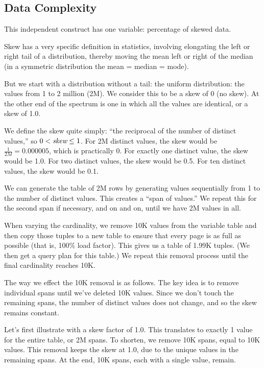 \documentclass[prodmode,acmtods]{acmsmall}
\begin{document}
\subsection{Data Complexity}\label{sec:datacomplexity}
This independent construct has one variable: percentage of skewed data.

Skew has a very specific definition in statistics, 
involving elongating the left or right tail of a distribution, 
thereby moving the mean left or right of the median 
(in a symmetric distribution the mean = median = mode).

But we start with a distribution without a tail: 
the uniform distribution: the values from 1 to 2 million (2M). 
We consider this to be a skew of 0 (no skew). 
At the other end of the spectrum is one in which all the values are identical, 
or a skew of 1.0.

We define the skew quite simply: ``the reciprocal of the number of distinct
values,'' so $0 < \hbox{\em skew} \leq 1$.
For 2M distinct values, the skew would be $\frac{1}{2M}= 0.000005$, which is practically 0. 
For exactly one distinct value, the skew would be 1.0. For two distinct values, 
the skew would be 0.5. For ten distinct values, the skew would be 0.1.

We can generate the table of 2M rows by generating values sequentially from
1 to the number of distinct values.  This creates a ``span of values.'' We
repeat this for the second span if necessary, and on and on, until we have
2M values in all.

When varying the cardinality, we remove 10K values from the variable table
and then copy those tuples to a new table to ensure that every page is as
full as possible (that is, 100\% load factor).  This gives us a table of
1.99K tuples. (We then get a query plan for this table.)  We repeat this
removal process until the final cardinality reaches 10K.

The way we effect the 10K removal is as follows. 
The key idea is to remove individual spans until we've deleted 10K
values. Since we don't touch the remaining spans, the number of distinct
values does not change, and so the skew remains constant.

Let's first illustrate with a skew factor of 1.0. 
This translates to exactly 1 value for the entire table, or 2M spans.
To shorten, we remove 10K spans, equal to 10K values. 
This removal keeps the skew at 1.0, due to the unique values in the
remaining spans.
At the end, 10K spans, each with a single value, remain.
\end{document}
